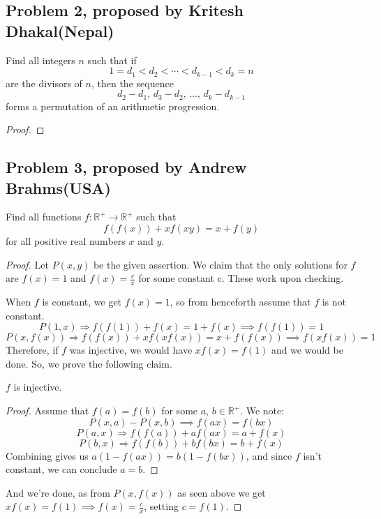 \documentclass[11pt]{scrartcl}
\begin{document}
\newpage

\subsection{Problem 2, proposed by Kritesh Dhakal(Nepal)}

\begin{problem}
    Find all integers $n$ such that if
    \[
    1 = d_1 < d_2 < \cdots < d_{k-1} < d_k = n
    \]
    are the divisors of $n$, then the sequence
    \[
    d_2 - d_1,\, d_3 - d_2,\, \ldots,\, d_k - d_{k-1}
    \]
    forms a permutation of an arithmetic progression.
\end{problem}

\begin{proof}

\end{proof}

\newpage

\subsection{Problem 3, proposed by Andrew Brahms(USA)}

\begin{problem}
    Find all functions $f : \mathbb{R}^+ \rightarrow \mathbb{R}^+$ such that
    \[f(f(x)) + xf(xy) = x + f(y)\]
    for all positive real numbers $x$ and $y$.
\end{problem}

\begin{proof}
    Let $P(x, y)$ be the given assertion.
    We claim that the only solutions for $f$ are $f(x) = 1$ and $f(x) = \frac cx$ for some constant c. These work upon checking.
    
    When $f$ is constant, we get $f(x) = 1$, so from henceforth assume that $f$ is not constant.
    \[
    P(1, x) \Longrightarrow f(f(1)) + f(x) = 1 + f(x) \implies f(f(1)) = 1
    \]
    \[
    P(x, f(x)) \Longrightarrow f(f(x)) + xf(xf(x)) = x + f(f(x)) \implies f(xf(x)) = 1
    \]
    Therefore, if $f$ was injective, we would have $xf(x) = f(1)$ and we would be done. So, we prove
    the following claim.
    \begin{claim}
        $f$ is injective.
        \begin{proof}
            Assume that $f(a) = f(b)$ for some $a$, $b \in \mathbb{R}^+$. We note:
            \[
            P(x, a) - P(x, b) \implies f(ax) = f(bx)
            \]
            \[
            P(a, x) \Longrightarrow f(f(a)) + af(ax) = a + f(x)
            \]
            \[
            P(b, x) \Longrightarrow f(f(b)) + bf(bx) = b + f(x)
            \]
            Combining gives us $a(1-f(ax)) = b(1-f(bx))$, and since $f$ isn't constant, we can conclude $a=b$.
        \end{proof}
    \end{claim}
    And we're done, as from $P(x, f(x))$ as seen above we get $xf(x) = f(1) \implies f(x) = \frac cx$, setting $c = f(1)$.
\end{proof}
\end{document}
